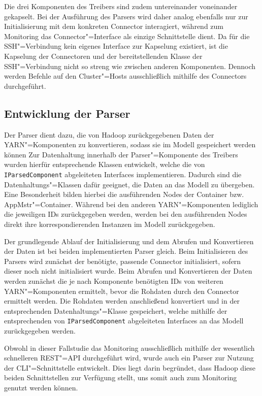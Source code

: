 Die drei Komponenten des Treibers sind zudem untereinander  voneinander gekapselt.
Bei der Ausführung des Parsers wird daher analog ebenfalls nur zur Initialisierung mit dem konkreten Connector interagiert, während zum Monitoring das Connector"=Interface als einzige Schnittstelle dient.
Da für die SSH"=Verbindung kein eigenes Interface zur Kapselung existiert, ist die Kapselung der Connectoren und der bereitstellenden Klasse der SSH"=Verbindung nicht so streng wie zwischen anderen Komponenten.
Dennoch werden Befehle auf den Cluster"=Hosts ausschließlich mithilfe des Connectors durchgeführt.

\subsection{Entwicklung der Parser}
\label{subsec:implementedParsers}

Der Parser dient dazu, die von Hadoop zurückgegebenen Daten der YARN"=Komponenten zu konvertieren, sodass sie im Modell gespeichert werden können
Zur Datenhaltung innerhalb der Parser"=Komponente des Treibers wurden hierfür entsprechende Klassen entwickelt, welche die von \texttt{IParsedComponent} abgeleiteten Interfaces implementieren.
Dadurch sind die Datenhaltungs"=Klassen dafür geeignet, die Daten an das Modell zu übergeben.
Eine Besonderheit bilden hierbei die ausführenden Nodes der Container bzw. \gls{AppMstr}"=Container.
Während bei den anderen YARN"=Komponenten lediglich die jeweiligen IDs zurückgegeben werden, werden bei den ausführenden Nodes direkt ihre korrespondierenden Instanzen im Modell zurückgegeben.

Der grundlegende Ablauf der Initialisierung und dem Abrufen und Konvertieren der Daten ist bei beiden implementierten Parser gleich.
Beim Initialisieren des Parsers wird zunächst der benötigte, passende Connector initialisiert, sofern dieser noch nicht initialisiert wurde.
Beim Abrufen und Konvertieren der Daten werden zunächst die je nach Komponente benötigten IDs von weiteren YARN"=Komponenten ermittelt, bevor die Rohdaten durch den Connector ermittelt werden.
Die Rohdaten werden anschließend konvertiert und in der entsprechenden Datenhaltungs"=Klasse gespeichert, welche mithilfe der entsprechenden von \texttt{IParsedComponent} abgeleiteten Interfaces an das Modell zurückgegeben werden.

Obwohl in dieser Fallstudie das Monitoring ausschließlich mithilfe der wesentlich schnelleren REST"=API durchgeführt wird, wurde auch ein Parser zur Nutzung der \gls{CLI}"=Schnittstelle entwickelt.
Dies liegt darin begründet, dass Hadoop diese beiden Schnittstellen zur Verfügung stellt, uns somit auch zum Monitoring genutzt werden können.


